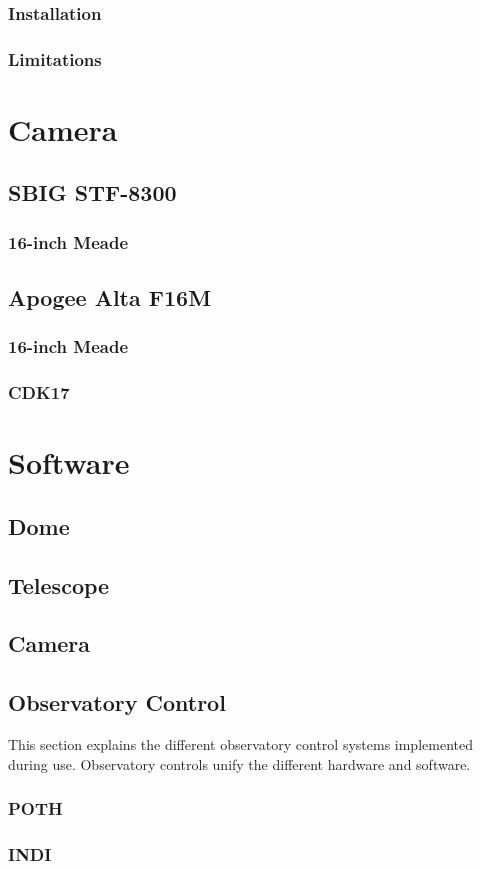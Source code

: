 \subsubsection{Installation}
\subsubsection{Limitations}

\section{Camera}
\subsection{SBIG STF-8300}
\subsubsection{16-inch Meade}

\subsection{Apogee Alta F16M}
\subsubsection{16-inch Meade}
\subsubsection{CDK17}

\section{Software}
\subsection{Dome}
\subsection{Telescope}
\subsection{Camera}
\subsection{Observatory Control}
This section explains the different observatory control systems implemented during use.
Observatory controls unify the different hardware and software. 
\subsubsection{POTH}
\subsubsection{INDI}
